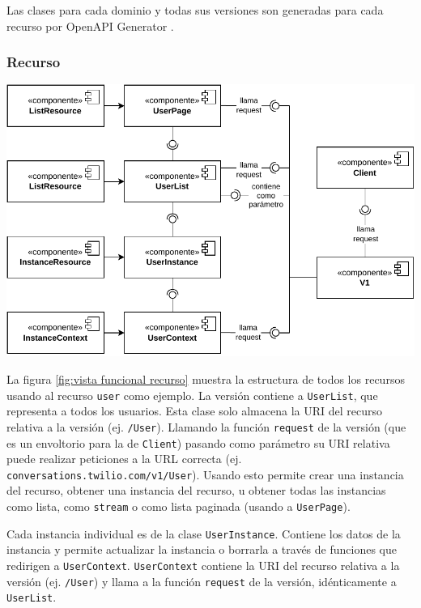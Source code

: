 \documentclass{article}
\begin{document}
Las clases para cada dominio y todas sus versiones
son generadas para cada recurso por OpenAPI Generator
\cite{twilio-generated-openapi}.

\subsubsection{Recurso}

\hfill

\begin{center}
  \includegraphics[width=\textwidth]{VistaFuncionalRecurso.pdf}
  \label{fig:vista funcional recurso}
\end{center}

\hfill

La figura \ref{fig:vista funcional recurso}
muestra la estructura de todos los recursos
usando al recurso \verb|user| como ejemplo.
La versión contiene a \verb|UserList|,
que representa a todos los usuarios.
Esta clase solo almacena la URI del recurso relativa a la versión
(ej. \verb|/User|).
Llamando la función \verb|request| de la versión
(que es un envoltorio para la de \verb|Client|)
pasando como parámetro su URI relativa
puede realizar peticiones a la URL correcta
(ej. \verb|conversations.twilio.com/v1/User|).
Usando esto permite crear una instancia del recurso,
obtener una instancia del recurso,
u obtener todas las instancias
como lista, como \verb|stream| o como lista paginada
(usando a \verb|UserPage|).

Cada instancia individual es de la clase \verb|UserInstance|.
Contiene los datos de la instancia
y permite actualizar la instancia o borrarla
a través de funciones que redirigen a \verb|UserContext|.
\verb|UserContext| contiene la URI del recurso relativa a la versión
(ej. \verb|/User|)
y llama a la función \verb|request| de la versión,
idénticamente a \verb|UserList|.
\end{document}
